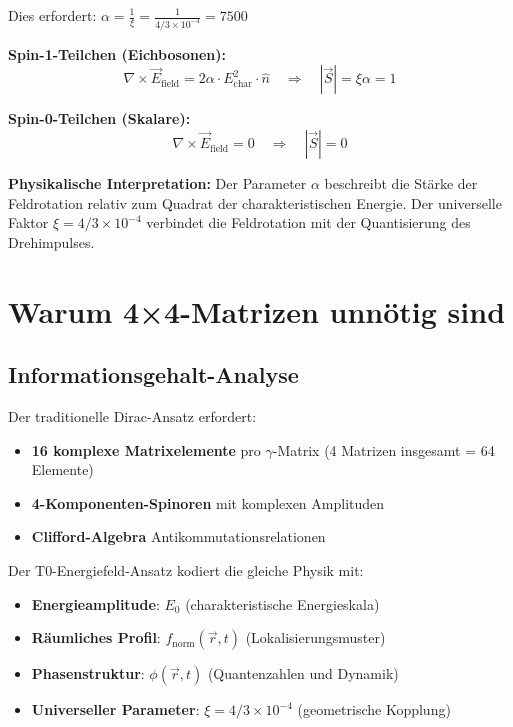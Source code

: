 \documentclass[12pt,a4paper]{report}
\begin{document}
	Dies erfordert: $\alpha = \frac{1}{\xi} = \frac{1}{4/3 \times 10^{-4}} = 7500$
	
	\textbf{Spin-1-Teilchen (Eichbosonen):}
	\begin{equation}
		\nabla \times \vec{E}_{\text{field}} = 2\alpha \cdot E_{\text{char}}^2 \cdot \hat{n} \quad \Rightarrow \quad |\vec{S}| = \xi \alpha = 1
	\end{equation}
	
	\textbf{Spin-0-Teilchen (Skalare):}
	\begin{equation}
		\nabla \times \vec{E}_{\text{field}} = 0 \quad \Rightarrow \quad |\vec{S}| = 0
	\end{equation}
	
	\textbf{Physikalische Interpretation:}
	Der Parameter $\alpha$ beschreibt die Stärke der Feldrotation relativ zum Quadrat der charakteristischen Energie. Der universelle Faktor $\xi = 4/3 \times 10^{-4}$ verbindet die Feldrotation mit der Quantisierung des Drehimpulses.
	
	\section{Warum 4×4-Matrizen unnötig sind}
	\label{sec:matrix_elimination_justification}
	
	\subsection{Informationsgehalt-Analyse}
	\label{subsec:information_content}
	
	Der traditionelle Dirac-Ansatz erfordert:
	\begin{itemize}
		\item \textbf{16 komplexe Matrixelemente} pro $\gamma$-Matrix (4 Matrizen insgesamt = 64 Elemente)
		\item \textbf{4-Komponenten-Spinoren} mit komplexen Amplituden
		\item \textbf{Clifford-Algebra} Antikommutationsrelationen
	\end{itemize}
	
	Der T0-Energiefeld-Ansatz kodiert die gleiche Physik mit:
	\begin{itemize}
		\item \textbf{Energieamplitude}: $E_0$ (charakteristische Energieskala)
		\item \textbf{Räumliches Profil}: $f_{\text{norm}}(\vec{r}, t)$ (Lokalisierungsmuster)
		\item \textbf{Phasenstruktur}: $\phi(\vec{r}, t)$ (Quantenzahlen und Dynamik)
		\item \textbf{Universeller Parameter}: $\xi = 4/3 \times 10^{-4}$ (geometrische Kopplung)
	\end{itemize}
	
\end{document}
